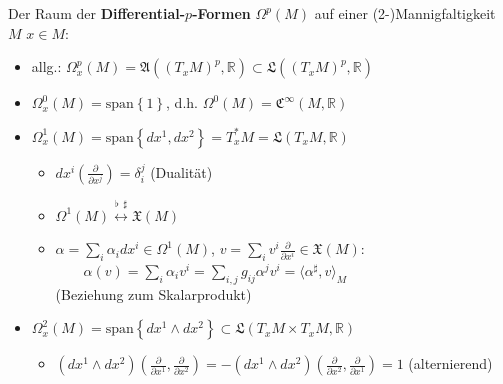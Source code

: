 \documentclass{beamer}
\newcommand{\R}{\mathds{R}}
\begin{document}
  \begin{frame}
    \begin{block}{Der Raum der \textbf{Differential-\( p \)-Formen} \( \Omega^{p}(M) \) auf einer (2-)Mannigfaltigkeit \( M \)}
      \( x \in M \):
      \begin{itemize}
        \item allg.: \(\Omega^{p}_{x}(M) = \mathfrak{A}(\left( T_{x}M \right)^{p}, \R) \subset \mathfrak{L}(\left( T_{x}M \right)^{p}, \R) \)
        \item<2-> \( \Omega^{0}_{x}(M) = \text{span}\left\{ 1 \right\} \), d.h. \( \Omega^{0}(M) = \mathfrak{C}^{\infty}(M, \R)\)
        \item<3-> \( \Omega^{1}_{x}(M) = \text{span}\left\{ dx^{1}, dx^{2} \right\} = T_{x}^{*}M = \mathfrak{L}(T_{x}M, \R) \) 
        \begin{itemize}
          \item \( dx^{i}\left(\frac{\partial}{\partial x^{j}}\right) = \delta_{i}^{j} \) (Dualität)
          \item \(\Omega^{1}(M) \overset{\flat\ \ \sharp}{\longleftrightarrow} \mathfrak{X}(M)\)
          \item  \( \alpha = \sum_{i}\alpha_{i}dx^{i} \in \Omega^{1}(M) \), \( v = \sum_{i}v^{i}\frac{\partial}{\partial x^{i}} \in \mathfrak{X}(M)  \):\\
              \( \qquad \alpha(v) = \sum_{i}\alpha_{i}v^{i} = \sum_{i,j}g_{ij}\alpha^{j}v^{i} = \langle \alpha^{\sharp}, v \rangle_{M} \)\\
              (Beziehung zum Skalarprodukt)
        \end{itemize}
        \item<4-> \( \Omega^{2}_{x}(M) = \text{span}\left\{ dx^{1} \wedge dx^{2}\right\} \subset \mathfrak{L}(T_{x}M \times T_{x}M, \R) \)
        \begin{itemize}
          \item \( \left(dx^{1}\wedge dx^{2}\right) \left(\frac{\partial}{\partial x^{1}}, \frac{\partial}{\partial x^{2}}\right)
              = -\left(dx^{1}\wedge dx^{2}\right) \left(\frac{\partial}{\partial x^{2}}, \frac{\partial}{\partial x^{1}}\right) = 1 \)
              (alternierend)
        \end{itemize}
      \end{itemize}
    \end{block}
  \end{frame}
\end{document}
